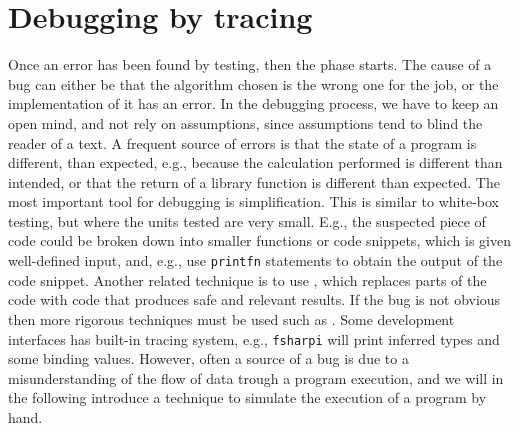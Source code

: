 \begin{comment}
  http://www.scientificamerican.com/article/pogue-5-most-embarrassing-software-bugs-in-history/, 5 Most Embarrassing Software Bugs in History

  http://royal.pingdom.com/2009/03/19/10-historical-software-bugs-with-extreme-consequences/

  https://raygun.com/blog/2014/05/10-costly-software-errors-history/

  http://www.computerworld.com/article/2515483/enterprise-applications/epic-failures--11-infamous-software-bugs.html

  http://catless.ncl.ac.uk/Risks/20.59.html#subj1

  https://en.wikipedia.org/wiki/List_of_software_bugs

  December 19, 1991; ISO/IEC 9126, international standard for the evaluation of software quality, replaced by ISO/IEC 25010:2011. Not publicly available, \footnote{A review of the ISO/IEC 9126 is given in \url{http://www.sqa.net/iso9126.html}. A brief review of ISO/IEC 25010:2011 is given in }
\end{comment}

\section{Debugging by tracing}
Once an error has been found by testing, then the  phase starts. The cause of a bug can either be that the algorithm chosen is the wrong one for the job, or the implementation of it has an error. In the debugging process, we have to keep an open mind, and not rely on assumptions, since assumptions tend to blind the reader of a text. A frequent source of errors is that the state of a program is different, than expected, e.g., because the calculation performed is different than intended, or that the return of a library function is different than expected. The most important tool for debugging is simplification. This is similar to white-box testing, but where the units tested are very small. E.g., the suspected piece of code could be broken down into smaller functions or code snippets, which is given well-defined input, and, e.g., use \lstinline!printfn! statements to obtain the output of the code snippet. Another related technique is to use , which replaces parts of the code with code that produces safe and relevant results. If the bug is not obvious then more rigorous techniques must be used such as . Some development interfaces has built-in tracing system, e.g., \lstinline[language=console]{fsharpi} will print inferred types and some binding values. However, often a source of a bug is due to a misunderstanding of the flow of data trough a program execution, and we will in the following introduce  a technique to simulate the execution of a program by hand.

